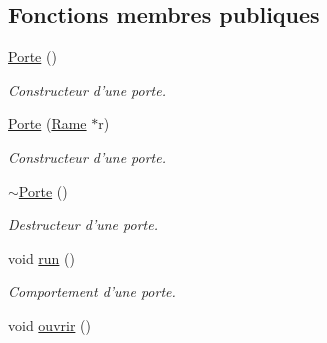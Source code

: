 \subsection*{Fonctions membres publiques}
\begin{DoxyCompactItemize}
\item 
\hypertarget{classPorte_a05e19e08d3ff7f043ea0a10a5014641a}{
\hyperlink{classPorte_a05e19e08d3ff7f043ea0a10a5014641a}{Porte} ()}
\label{classPorte_a05e19e08d3ff7f043ea0a10a5014641a}

\begin{DoxyCompactList}\small\item\em Constructeur d'une porte. \item\end{DoxyCompactList}\item 
\hypertarget{classPorte_a4b2871553ecea50b1aae06fff264ce4b}{
\hyperlink{classPorte_a4b2871553ecea50b1aae06fff264ce4b}{Porte} (\hyperlink{classRame}{Rame} $\ast$r)}
\label{classPorte_a4b2871553ecea50b1aae06fff264ce4b}

\begin{DoxyCompactList}\small\item\em Constructeur d'une porte. \item\end{DoxyCompactList}\item 
\hypertarget{classPorte_a7b82ccac24bfd8b7fa701f7601328d6c}{
\hyperlink{classPorte_a7b82ccac24bfd8b7fa701f7601328d6c}{$\sim$Porte} ()}
\label{classPorte_a7b82ccac24bfd8b7fa701f7601328d6c}

\begin{DoxyCompactList}\small\item\em Destructeur d'une porte. \item\end{DoxyCompactList}\item 
\hypertarget{classPorte_a6da489b2494630c2e49afb6b14135565}{
void \hyperlink{classPorte_a6da489b2494630c2e49afb6b14135565}{run} ()}
\label{classPorte_a6da489b2494630c2e49afb6b14135565}

\begin{DoxyCompactList}\small\item\em Comportement d'une porte. \item\end{DoxyCompactList}\item 
\hypertarget{classPorte_a588ea2df3d7e9db98d4ce7426c4ba7f9}{
void \hyperlink{classPorte_a588ea2df3d7e9db98d4ce7426c4ba7f9}{ouvrir} ()}
\label{classPorte_a588ea2df3d7e9db98d4ce7426c4ba7f9}


\end{DoxyCompactItemize}
